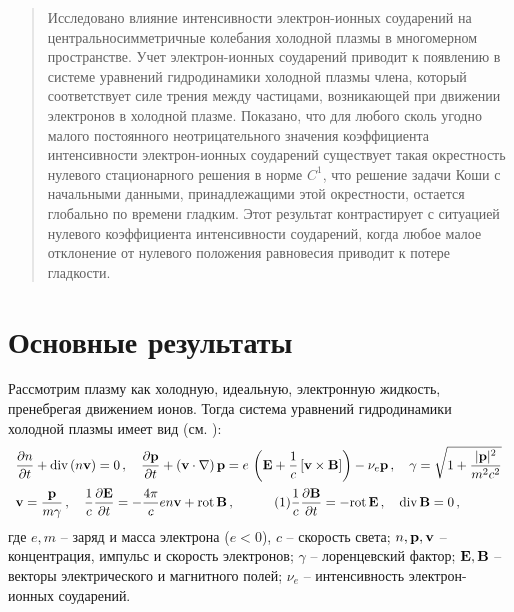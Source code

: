\maketitle

\begin{abstract}
Исследовано влияние интенсивности электрон-ионных соударений на центральносимметричные колебания холодной плазмы в многомерном пространстве. Учет элек\-трон-ионных соударений приводит к появлению в системе уравнений гидродинамики холодной плазмы члена, который соответствует силе трения между частицами, возникающей при движении электронов в холодной плазме. Показано, что для любого сколь угодно малого постоянного неотрицательного значения коэффициента интенсивности электрон-ионных соударений существует такая окрестность нулевого стационарного решения в норме $C^1$, что решение задачи Коши с начальными данными, принадлежащими этой окрестности, остается глобально по времени гладким. Этот результат контрастирует с ситуацией нулевого коэффициента интенсивности соударений, когда  любое малое отклонение от нулевого положения равновесия приводит к потере гладкости. 

\end{abstract}

\section{Основные результаты} %
Рассмотрим плазму как холодную, идеальную, электронную жидкость, пренебрегая движением ионов. Тогда система уравнений гидродинамики холодной плазмы имеет вид (см. \cite{Ginzburg}):
\begin{equation*}
\begin{array}{l}
\dfrac{\partial n }{\partial t} + \mbox{div}\,(n \bv)=0\,,\quad
\dfrac{\partial \bp }{\partial t} + \left( \bv \cdot \nabla \right) \bp
= e \, \left( {\bf E} + \dfrac{1}{c} \left[\bv \times  {\bf B}\right]\right) - \nu_e \bp \,,\quad
\gamma = \sqrt{ 1+ \dfrac{|\bp|^2}{m^2c^2} }\,\vspace{0.5em}\\
\bv = \dfrac{\bp}{m \gamma}\,,\quad
\dfrac1{c} \frac{\partial {\bf E} }{\partial t} = - \dfrac{4 \pi}{c} e n \bv
 + {\rm rot}\, {\bf B}\,,\quad \tag{1}
\dfrac1{c} \frac{\partial {\bf B} }{\partial t}  =
 - {\rm rot}\, {\bf E}\,, \quad \mbox{div}\, {\bf B}=0\,,
\end{array}
\end{equation*}
где
$e, m$ -- заряд и масса электрона ($e < 0$),
$c$ -- скорость света;
$ n, {\bf p}, {\bf v}$ -- концентрация, импульс и скорость
электронов;
$\gamma$ -- лоренцевский фактор;
$ {\bf E}, {\bf B} $ -- векторы электрического и магнитного полей;
$\nu_e$ -- интенсивность электрон-ионных соударений. 

